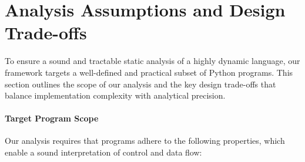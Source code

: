 \clearpage
\appendix
\section{Analysis Assumptions and Design Trade-offs}
\label{sec:appendix-assumptions}

To ensure a sound and tractable static analysis of a highly dynamic language, our framework targets a well-defined and practical subset of Python programs. This section outlines the scope of our analysis and the key design trade-offs that balance implementation complexity with analytical precision.

\paragraph{Target Program Scope}
Our analysis requires that programs adhere to the following properties, which enable a sound interpretation of control and data flow:
